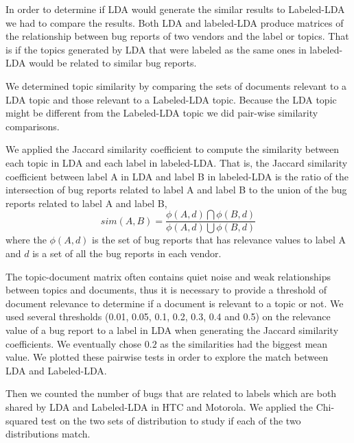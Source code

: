 \documentclass[10pt, conference, compsocconf]{IEEEtran}
\begin{document}
In order to determine if LDA would generate the similar results to
Labeled-LDA we had to compare the results.
Both LDA and labeled-LDA produce matrices of
 the relationship between bug reports of two vendors and the
label or topics. 
That is if the topics generated by LDA that were labeled as the same
ones in labeled-LDA would be related to similar bug reports.

We determined topic similarity by comparing the sets of documents
relevant to a LDA topic and those relevant to a Labeled-LDA
topic. Because the LDA topic might be different from the Labeled-LDA
topic we did pair-wise similarity comparisons.

We applied the Jaccard similarity coefficient to compute the
similarity between each topic in LDA and each label in labeled-LDA. 
That is, the Jaccard similarity coefficient between label A in LDA and
label B in labeled-LDA is the ratio of the intersection of bug reports
related to label A and label B to the union of the bug reports related
to label A and label B,
\begin{equation}
sim(A,B) = \frac{\phi(A,d)\bigcap\phi(B,d)}{\phi(A,d)\bigcup\phi(B,d)}
\end{equation}
where the $\phi(A,d)$ is the set of bug reports that has relevance
values to label A and $d$ is a set of all the bug reports in each
vendor.

The topic-document matrix often contains quiet noise and weak
relationships between topics and documents, thus it is necessary to
provide a threshold of document relevance to determine if a document
is relevant to a topic or not.
We used several thresholds (0.01, 0.05, 0.1, 0.2, 0.3, 0.4 and 0.5) on
the relevance value of a bug report to a label in LDA when generating
the Jaccard similarity coefficients. We eventually chose $0.2$ as the similarities had the biggest mean value.
We plotted these pairwise tests in order to explore the match between
LDA and Labeled-LDA.

Then we counted the number of bugs that are related to labels which are both shared by LDA and Labeled-LDA in HTC and Motorola. We applied the Chi-squared test on the two sets of distribution to study if each of the two distributions match.
\end{document}

